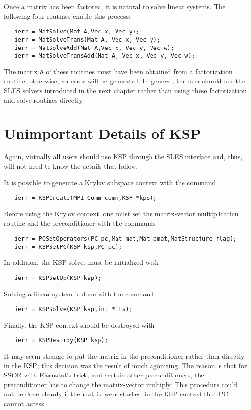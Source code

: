 Once a matrix has been factored, it is natural to solve linear systems.
The following four routines enable this process:  
\begin{verbatim}
   ierr = MatSolve(Mat A,Vec x, Vec y);
   ierr = MatSolveTrans(Mat A, Vec x, Vec y);
   ierr = MatSolveAdd(Mat A,Vec x, Vec y, Vec w);
   ierr = MatSolveTransAdd(Mat A, Vec x, Vec y, Vec w);
\end{verbatim}
The  
matrix 
{\tt A} of these routines must have been obtained from a 
factorization routine; otherwise, an error will be generated.
In general, the user should use the SLES solvers introduced in the 
next chapter rather than using these factorization and solve routines
directly.

\section{Unimportant Details of KSP}

Again, virtually all users should use KSP through the SLES interface
and, thus, will not need to know the details that follow. 

It is possible to generate a Krylov subspace context with the 
command 
\begin{verbatim}
   ierr = KSPCreate(MPI_Comm comm,KSP *kps);
\end{verbatim}
Before using the Krylov context, one must set the matrix-vector multiplication routine and
the preconditioner with the 
commands  
\begin{verbatim}
   ierr = PCSetOperators(PC pc,Mat mat,Mat pmat,MatStructure flag);
   ierr = KSPSetPC(KSP ksp,PC pc);
\end{verbatim}
In addition, the KSP solver must be initialized with 
\begin{verbatim}
   ierr = KSPSetUp(KSP ksp);
\end{verbatim}
Solving a linear system is done with the command 
\begin{verbatim}
   ierr = KSPSolve(KSP ksp,int *its);
\end{verbatim}
Finally, the KSP context should be destroyed with 
\begin{verbatim}
   ierr = KSPDestroy(KSP ksp);
\end{verbatim}

It may seem strange to put the matrix in the preconditioner rather
than directly in the KSP; this decision was the result of much
agonizing. The reason is that for SSOR with Eisenstat's trick, and 
certain other preconditioners, the
preconditioner has to change the matrix-vector multiply.  This 
procedure could not
be done cleanly if the matrix were stashed in the KSP context that
PC cannot access.

